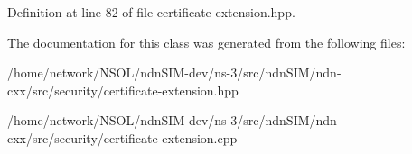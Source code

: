 Definition at line 82 of file certificate-\/extension.\+hpp.



The documentation for this class was generated from the following files\+:\begin{DoxyCompactItemize}
\item 
/home/network/\+N\+S\+O\+L/ndn\+S\+I\+M-\/dev/ns-\/3/src/ndn\+S\+I\+M/ndn-\/cxx/src/security/certificate-\/extension.\+hpp\item 
/home/network/\+N\+S\+O\+L/ndn\+S\+I\+M-\/dev/ns-\/3/src/ndn\+S\+I\+M/ndn-\/cxx/src/security/certificate-\/extension.\+cpp\end{DoxyCompactItemize}
